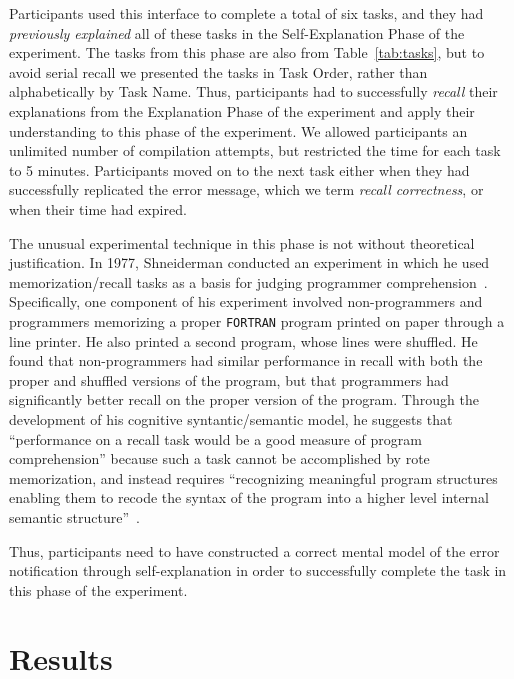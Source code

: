 \documentclass[conference]{IEEEtran}
\begin{document}
Participants used this interface to complete a total of six tasks, and they had \textit{previously explained} all of these tasks in the Self-Explanation Phase of the experiment. The tasks from this phase are also from Table~\ref{tab:tasks}, but to avoid serial recall we presented the tasks in Task Order, rather than alphabetically by Task Name. Thus, participants had to successfully \textit{recall} their explanations from the Explanation Phase of the experiment and apply their understanding to this phase of the experiment. We allowed participants an unlimited number of compilation attempts, but restricted the time for each task to 5 minutes. Participants moved on to the next task either when they had successfully replicated the error message, which we term \textit{recall correctness}, or when their time had expired.

The unusual experimental technique in this phase is not without theoretical justification. In 1977, Shneiderman conducted an experiment in which he used memorization/recall tasks as a basis for judging programmer comprehension~\cite{Shneiderman1977}. Specifically, one component of his experiment involved non-programmers and programmers memorizing a proper \texttt{FORTRAN} program printed on paper through a line printer. He also printed a second program, whose lines were shuffled. He found that non-programmers had similar performance in recall with both the proper and shuffled versions of the program, but that programmers had significantly better recall on the proper version of the program. Through the development of his cognitive syntantic/semantic model, 
he suggests that ``performance on a recall task would be a good measure of program comprehension'' because such a task cannot be accomplished by rote memorization, and instead requires ``recognizing meaningful program structures enabling them to recode the syntax of the program into a higher level internal semantic structure''~\cite{Shneiderman1977}.

Thus, participants need to have constructed a correct mental model of the error notification through self-explanation in order to successfully complete the task in this phase of the experiment.

\section{Results}

\end{document}
